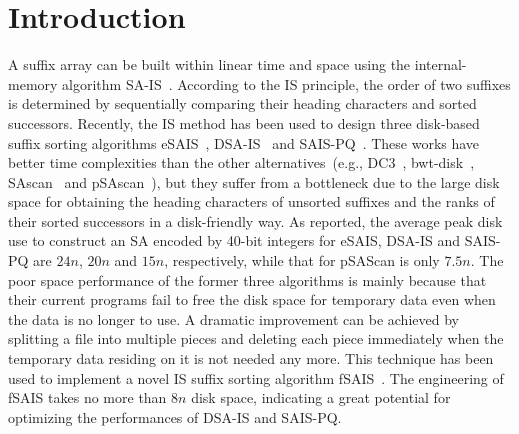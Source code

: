 \documentclass[10pt,journal,compsoc]{IEEEtran}
\begin{document}
\maketitle

\IEEEdisplaynontitleabstractindextext

\IEEEpeerreviewmaketitle

\section{Introduction}\label{sec:introduction}

A suffix array can be built within linear time and space using the internal-memory algorithm SA-IS~\cite{Nong11}. According to the IS principle, the order of two suffixes is determined by sequentially comparing their heading characters and sorted successors. Recently, the IS method has been used to design three disk-based suffix sorting algorithms eSAIS~\cite{Bingmann12}, DSA-IS~\cite{Nong15} and SAIS-PQ~\cite{Liu15}. These works have better time complexities than the other alternatives~(e.g., DC3~\cite{Dementiev2008a}, bwt-disk~\cite{Ferragina2012}, SAscan~\cite{Karkkainen2014} and pSAscan~\cite{Karkkainen2015}), but they suffer from a bottleneck due to the large disk space for obtaining the heading characters of unsorted suffixes and the ranks of their sorted successors in a disk-friendly way. As reported, the average peak disk use to construct an SA encoded by 40-bit integers for eSAIS, DSA-IS and SAIS-PQ are $24n$, $20n$ and $15n$, respectively, while that for pSAScan is only $7.5n$. The poor space performance of the former three algorithms is mainly because that their current programs fail to free the disk space for temporary data even when the data is no longer to use. A dramatic improvement can be achieved by splitting a file into multiple pieces and deleting each piece immediately when the temporary data residing on it is not needed any more. This technique has been used to implement a novel IS suffix sorting algorithm fSAIS~\cite{Karkkainen2017}. The engineering of fSAIS takes no more than $8n$ disk space, indicating a great potential for optimizing the performances of DSA-IS and SAIS-PQ. 
\end{document}
